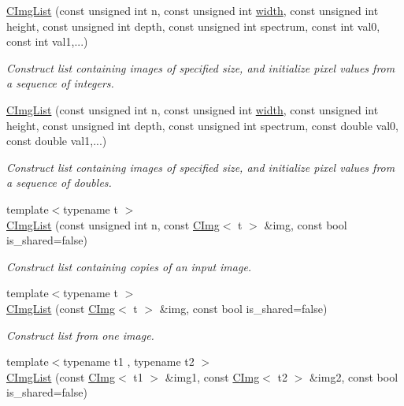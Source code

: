 \begin{DoxyCompactItemize}
\hyperlink{structcimg__library__suffixed_1_1CImgList_a17c98796f61d60620d027533e4b110f6}{C\+Img\+List} (const unsigned int n, const unsigned int \hyperlink{structcimg__library__suffixed_1_1CImgList_a60d81967a11f946a46ab28f2f14109f7}{width}, const unsigned int height, const unsigned int depth, const unsigned int spectrum, const int val0, const int val1,...)
\begin{DoxyCompactList}\small\item\em Construct list containing images of specified size, and initialize pixel values from a sequence of integers. \end{DoxyCompactList}\item 
\hyperlink{structcimg__library__suffixed_1_1CImgList_a9a0a87be5eb8596b3b96b89aa1bbb3ce}{C\+Img\+List} (const unsigned int n, const unsigned int \hyperlink{structcimg__library__suffixed_1_1CImgList_a60d81967a11f946a46ab28f2f14109f7}{width}, const unsigned int height, const unsigned int depth, const unsigned int spectrum, const double val0, const double val1,...)
\begin{DoxyCompactList}\small\item\em Construct list containing images of specified size, and initialize pixel values from a sequence of doubles. \end{DoxyCompactList}\item 
{\footnotesize template$<$typename t $>$ }\\\hyperlink{structcimg__library__suffixed_1_1CImgList_adb1654540088f63758dbed91220cb5f1}{C\+Img\+List} (const unsigned int n, const \hyperlink{structcimg__library__suffixed_1_1CImg}{C\+Img}$<$ t $>$ \&img, const bool is\+\_\+shared=false)
\begin{DoxyCompactList}\small\item\em Construct list containing copies of an input image. \end{DoxyCompactList}\item 
{\footnotesize template$<$typename t $>$ }\\\hyperlink{structcimg__library__suffixed_1_1CImgList_a0e63870941fe962d1be4cd2a5c5e3cd4}{C\+Img\+List} (const \hyperlink{structcimg__library__suffixed_1_1CImg}{C\+Img}$<$ t $>$ \&img, const bool is\+\_\+shared=false)
\begin{DoxyCompactList}\small\item\em Construct list from one image. \end{DoxyCompactList}\item 
{\footnotesize template$<$typename t1 , typename t2 $>$ }\\\hyperlink{structcimg__library__suffixed_1_1CImgList_a83b2d5b58d0614f7a091c9001cb81567}{C\+Img\+List} (const \hyperlink{structcimg__library__suffixed_1_1CImg}{C\+Img}$<$ t1 $>$ \&img1, const \hyperlink{structcimg__library__suffixed_1_1CImg}{C\+Img}$<$ t2 $>$ \&img2, const bool is\+\_\+shared=false)

\end{DoxyCompactItemize}
